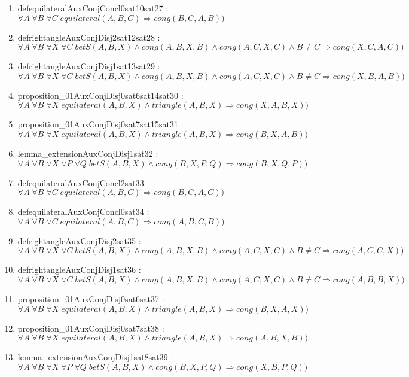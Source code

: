 \documentclass{article}
\begin{document}
\begin{enumerate}
\item defequilateralAuxConjConcl0sat10sat27 : $\forall A\;\forall B\;\forall C\;equilateral(A, B, C) \Rightarrow cong(B, C, A, B))$
\item defrightangleAuxConjDisj2sat12sat28 : $\forall A\;\forall B\;\forall X\;\forall C\;betS(A, B, X)\wedge cong(A, B, X, B)\wedge cong(A, C, X, C)\wedge B \neq C \Rightarrow cong(X, C, A, C))$
\item defrightangleAuxConjDisj1sat13sat29 : $\forall A\;\forall B\;\forall X\;\forall C\;betS(A, B, X)\wedge cong(A, B, X, B)\wedge cong(A, C, X, C)\wedge B \neq C \Rightarrow cong(X, B, A, B))$
\item proposition\_01AuxConjDisj0sat6sat14sat30 : $\forall A\;\forall B\;\forall X\;equilateral(A, B, X)\wedge triangle(A, B, X) \Rightarrow cong(X, A, B, X))$
\item proposition\_01AuxConjDisj0sat7sat15sat31 : $\forall A\;\forall B\;\forall X\;equilateral(A, B, X)\wedge triangle(A, B, X) \Rightarrow cong(B, X, A, B))$
\item lemma\_extensionAuxConjDisj1sat32 : $\forall A\;\forall B\;\forall X\;\forall P\;\forall Q\;betS(A, B, X)\wedge cong(B, X, P, Q) \Rightarrow cong(B, X, Q, P))$
\item defequilateralAuxConjConcl2sat33 : $\forall A\;\forall B\;\forall C\;equilateral(A, B, C) \Rightarrow cong(B, C, A, C))$
\item defequilateralAuxConjConcl0sat34 : $\forall A\;\forall B\;\forall C\;equilateral(A, B, C) \Rightarrow cong(A, B, C, B))$
\item defrightangleAuxConjDisj2sat35 : $\forall A\;\forall B\;\forall X\;\forall C\;betS(A, B, X)\wedge cong(A, B, X, B)\wedge cong(A, C, X, C)\wedge B \neq C \Rightarrow cong(A, C, C, X))$
\item defrightangleAuxConjDisj1sat36 : $\forall A\;\forall B\;\forall X\;\forall C\;betS(A, B, X)\wedge cong(A, B, X, B)\wedge cong(A, C, X, C)\wedge B \neq C \Rightarrow cong(A, B, B, X))$
\item proposition\_01AuxConjDisj0sat6sat37 : $\forall A\;\forall B\;\forall X\;equilateral(A, B, X)\wedge triangle(A, B, X) \Rightarrow cong(B, X, A, X))$
\item proposition\_01AuxConjDisj0sat7sat38 : $\forall A\;\forall B\;\forall X\;equilateral(A, B, X)\wedge triangle(A, B, X) \Rightarrow cong(A, B, X, B))$
\item lemma\_extensionAuxConjDisj1sat8sat39 : $\forall A\;\forall B\;\forall X\;\forall P\;\forall Q\;betS(A, B, X)\wedge cong(B, X, P, Q) \Rightarrow cong(X, B, P, Q))$

\end{enumerate}
\end{document}
